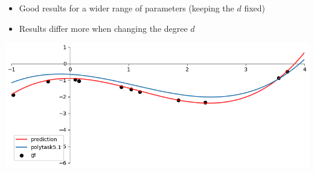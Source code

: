 \documentclass[10pt,aspectratio=169,handout]{beamer}
\begin{document}
\begin{frame}
    \frametitle{}

    \begin{minipage}{0.49\textwidth}
        \begin{itemize}
            \item Good results for a wider range of parameters (keeping the $d$ fixed)
            \item Results differ more when changing the degree $d$
        \end{itemize}
    \end{minipage}
    \begin{minipage}{0.49\textwidth}
        \includegraphics[width=\textwidth]{images/task5-2.png}
    \end{minipage}

\end{frame}
\end{document}
